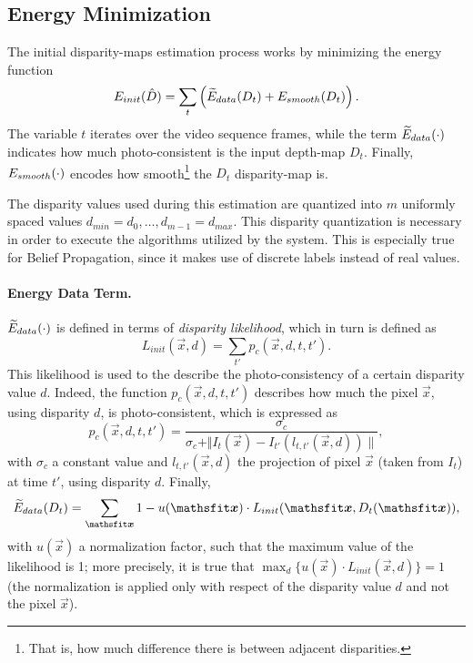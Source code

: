 \subsection{Energy Minimization}
The initial disparity-maps estimation process works by minimizing the energy function
\begin{equation}
\label{eq:init_energy}
E_{init}(\hat D) = \sum_{t} \left(\mathop{\widetilde{E}_{data}}(D_t) + \mathop{E_{smooth}}(D_t)\right).
\end{equation}
The variable $t$ iterates over the video sequence frames, while the term $\mathop{\widetilde{E}_{data}}(\cdot)$ indicates how much photo-consistent is the input depth-map $D_t$. Finally, $\mathop{E_{smooth}}(\cdot)$ encodes how smooth\footnote{That is, how much difference there is between adjacent disparities.} the $D_t$ disparity-map is.\\

\begin{Important}
	The disparity values used during this estimation are quantized into $m$ uniformly spaced values $d_{min}=d_0, \dots, d_{m-1} = d_{max}$. This disparity quantization is necessary in order to execute the algorithms utilized by the system. This is especially true for Belief Propagation, since it makes use of discrete labels instead of real values.
\end{Important}

\paragraph{Energy Data Term.}
$\mathop{\widetilde{E}_{data}}(\cdot)$ is defined in terms of \emph{disparity likelihood}, which in turn is defined as
$$L_{init}(\vec x, d) = \sum_{t'} p_c(\vec x,d,t,t').$$
This likelihood is used to the describe the photo-consistency of a certain disparity value $d$. Indeed, the function $p_c(\vec x,d,t,t')$ describes how much the pixel $\vec x$, using disparity $d$, is photo-consistent, which is expressed as
$$p_c(\vec x,d,t,t') = \frac{\sigma_c}{\sigma_c + \Vert I_t(\vec x) - I_{t'}(l_{t,t'}(\vec x,d))\rVert},$$
with $\sigma_c$ a constant value and $l_{t,t'}(\vec x,d)$ the projection of pixel $\vec x$ (taken from $I_t$) at time $t'$, using disparity $d$.
Finally, 
\begin{equation}\label{eq:init_energy_data}
\DataCostInit(D_t) = \sum_{\vec x} 1 -  u(\vec x) \cdot L_{init}(\vec x,D_t(\vec x)),
\end{equation}
with $u(\vec x)$ a normalization factor, such that the maximum value of the likelihood is 1; more precisely, it is true that $\max_{d} \{u(\vec x)\cdot L_{init}(\vec x, d)\} = 1$ (\ie the normalization is applied only with respect of the disparity value $d$ and not the pixel $\vec x$).

